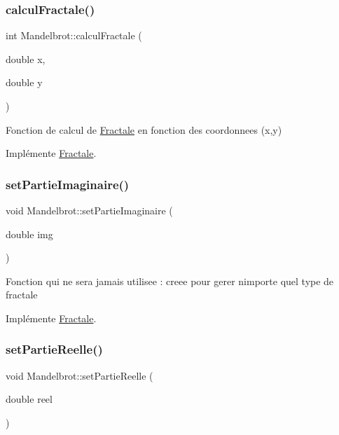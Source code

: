 \subsubsection{\texorpdfstring{calcul\+Fractale()}{calculFractale()}}
{\footnotesize\ttfamily int Mandelbrot\+::calcul\+Fractale (\begin{DoxyParamCaption}\item[{double}]{x,  }\item[{double}]{y }\end{DoxyParamCaption})\hspace{0.3cm}{\ttfamily [virtual]}}

Fonction de calcul de \hyperlink{classFractale}{Fractale} en fonction des coordonnees (x,y) 

Implémente \hyperlink{classFractale_a99a54c1b9b847ca24585f469cf03b67a}{Fractale}.

\mbox{\label{classMandelbrot_a9649677b1faeff917202845fd697dbe6}} 
\subsubsection{\texorpdfstring{set\+Partie\+Imaginaire()}{setPartieImaginaire()}}
{\footnotesize\ttfamily void Mandelbrot\+::set\+Partie\+Imaginaire (\begin{DoxyParamCaption}\item[{double}]{img }\end{DoxyParamCaption})\hspace{0.3cm}{\ttfamily [virtual]}}

Fonction qui ne sera jamais utilisee \+: creee pour gerer nimporte quel type de fractale 

Implémente \hyperlink{classFractale_ab2dc26f50f2b0a3cbe986986075fe8f5}{Fractale}.

\mbox{\label{classMandelbrot_a419baeb8628191ee44f3c82dd3281017}} 
\subsubsection{\texorpdfstring{set\+Partie\+Reelle()}{setPartieReelle()}}
{\footnotesize\ttfamily void Mandelbrot\+::set\+Partie\+Reelle (\begin{DoxyParamCaption}\item[{double}]{reel }\end{DoxyParamCaption})\hspace{0.3cm}{\ttfamily [virtual]}}

